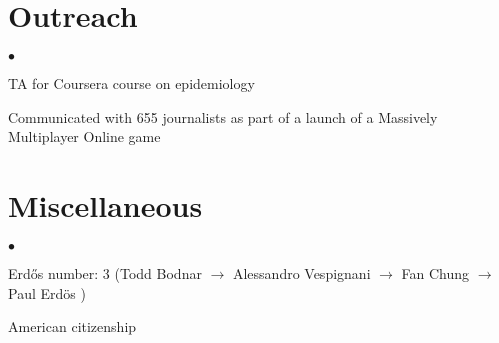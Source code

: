 \documentclass[margin,line]{res}
\newenvironment{list2}{
  \begin{list}{$\bullet$}{%
      \setlength{\itemsep}{0in}
      \setlength{\parsep}{0in} \setlength{\parskip}{0in}
      \setlength{\topsep}{0in} \setlength{\partopsep}{0in} 
      \setlength{\leftmargin}{0.2in}}}{\end{list}}
\begin{document}
\begin{resume}
\section{\sc Outreach}
\begin{list2}
\item TA for Coursera course on epidemiology
\item Communicated with 655 journalists as part of a launch of a Massively Multiplayer Online game
\end{list2}


\section{\sc Miscellaneous}
\begin{list2}
\item Erd\H{o}s number: 3 (Todd Bodnar \(\rightarrow\) Alessandro Vespignani \(\rightarrow\) Fan Chung \(\rightarrow\) Paul Erd\"os )
\item American citizenship
\end{list2}


\end{resume}
\end{document}
